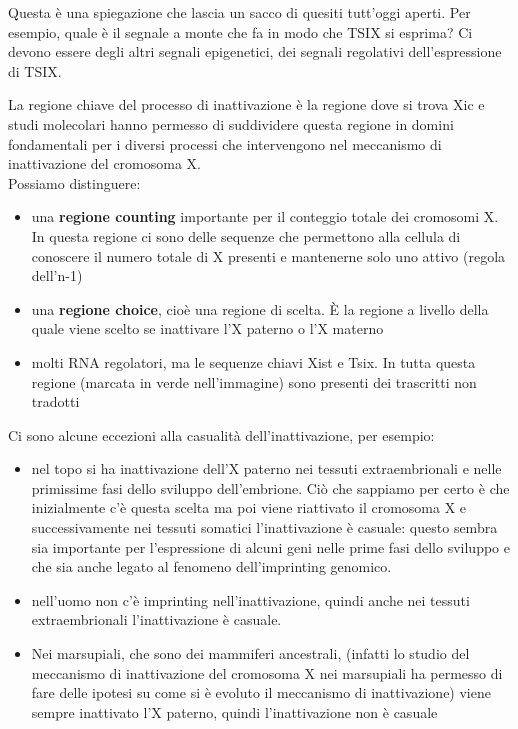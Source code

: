 \documentclass[11pt]{book}
\begin{document}
Questa è una spiegazione che lascia un sacco di quesiti tutt’oggi aperti. Per esempio, quale è il segnale a monte che fa in modo che TSIX si esprima? Ci devono essere degli altri segnali epigenetici, dei segnali regolativi dell’espressione di TSIX.

La regione chiave del processo di inattivazione è la regione dove si trova Xic e studi molecolari hanno permesso di suddividere questa regione in domini fondamentali per i diversi processi che intervengono nel meccanismo di inattivazione del cromosoma X.\\
Possiamo distinguere:
\begin{itemize}
\item una \textbf{regione counting} importante per il conteggio totale dei cromosomi X. In questa regione ci sono delle sequenze che permettono alla cellula di conoscere il numero totale di X presenti e mantenerne solo uno attivo (regola dell’n-1)
\item una \textbf{regione choice}, cioè una regione di scelta. È la regione a livello della quale viene scelto se inattivare l’X paterno o l’X materno
\item molti RNA regolatori, ma le sequenze chiavi Xist e Tsix. In tutta questa regione (marcata in verde nell’immagine) sono presenti dei trascritti non tradotti
\end{itemize}

Ci sono alcune eccezioni alla casualità dell’inattivazione, per esempio:
\begin{itemize}
\item nel topo si ha inattivazione dell’X paterno nei tessuti extraembrionali e nelle primissime fasi dello sviluppo dell’embrione. Ciò che sappiamo per certo è che inizialmente c’è questa scelta ma poi viene riattivato il cromosoma X e successivamente nei tessuti somatici l’inattivazione è casuale: questo sembra sia importante per l’espressione di alcuni geni nelle prime fasi dello sviluppo e che sia anche legato al fenomeno dell’imprinting genomico.
\item nell’uomo non c’è imprinting nell’inattivazione, quindi anche nei tessuti extraembrionali l’inattivazione è casuale.
\item Nei marsupiali, che sono dei mammiferi ancestrali, (infatti lo studio del meccanismo di inattivazione del cromosoma X nei marsupiali ha permesso di fare delle ipotesi su come si è evoluto il meccanismo di inattivazione) viene sempre inattivato l’X paterno, quindi l’inattivazione non è casuale
\end{itemize}
\end{document}
